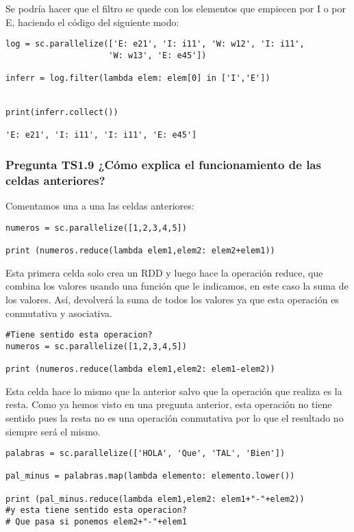 \documentclass[11pt]{article}
\begin{document}
{{Se podría hacer que el filtro se quede con los elementos que empiecen por I o por E, haciendo el código del siguiente modo:

\begin{verbatim}
log = sc.parallelize(['E: e21', 'I: i11', 'W: w12', 'I: i11',
                     'W: w13', 'E: e45'])

inferr = log.filter(lambda elem: elem[0] in ['I','E'])


print(inferr.collect())

'E: e21', 'I: i11', 'I: i11', 'E: e45']

\end{verbatim}
\subsubsection*{ Pregunta TS1.9 ¿Cómo explica el funcionamiento de las celdas anteriores?}

Comentamos una a una las celdas anteriores:

\begin{verbatim}
numeros = sc.parallelize([1,2,3,4,5])

print (numeros.reduce(lambda elem1,elem2: elem2+elem1))
\end{verbatim}

Esta primera celda solo crea un RDD y luego hace la operación reduce, que combina los valores usando una función que le indicamos, en este caso la suma de los valores. Así, devolverá la suma de todos los valores ya que esta operación es conmutativa y asociativa.


\begin{verbatim}
#Tiene sentido esta operacion?
numeros = sc.parallelize([1,2,3,4,5])

print (numeros.reduce(lambda elem1,elem2: elem1-elem2))
\end{verbatim}

Esta celda hace lo mismo que la anterior salvo que la operación que realiza es la resta. Como ya hemos visto en una pregunta anterior, esta operación no tiene sentido pues la resta no es una operación conmutativa por lo que el resultado no siempre será el mismo.

\begin{verbatim}
palabras = sc.parallelize(['HOLA', 'Que', 'TAL', 'Bien'])

pal_minus = palabras.map(lambda elemento: elemento.lower())

print (pal_minus.reduce(lambda elem1,elem2: elem1+"-"+elem2))
#y esta tiene sentido esta operacion?
# Que pasa si ponemos elem2+"-"+elem1
\end{verbatim}

}}
\end{document}
